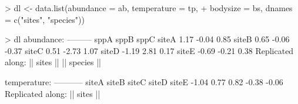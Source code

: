 \documentclass{beamer}
\numberwithin{exercise}{section}
\begin{document}
%

\begin{frame}[fragile]
\begin{Schunk}
\begin{Sinput}
> dl <- data.list(abundance = ab, temperature = tp,
+	bodysize = bs, dnames = c("sites", "species"))
\end{Sinput}
\end{Schunk}
\end{frame}

\begin{frame}[fragile]
\begin{Schunk}
\begin{Soutput}
> dl
abundance:
---------
       sppA  sppB  sppC
siteA  1.17 -0.04  0.85
siteB  0.65 -0.06 -0.37
siteC  0.51 -2.73  1.07
siteD -1.19  2.81  0.17
siteE -0.69 -0.21  0.38
Replicated along:  || sites || || species ||

temperature:
-----------
siteA siteB siteC siteD siteE 
-1.04  0.77  0.82 -0.38 -0.06 
Replicated along:  || sites || 
\end{Soutput}
\end{Schunk}
\begin{block}{}
\end{block}
\end{frame}
\end{document}
